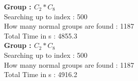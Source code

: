 \textbf{Group : $C_2*C_8$}\\
Searching up to index : 500\\
How many normal groups are found : 1187\\
Total Time in s : 4855.3\\
\textbf{Group : $C_2*C_8$}\\
Searching up to index : 500\\
How many normal groups are found : 1187\\
Total Time in s : 4916.2\\
